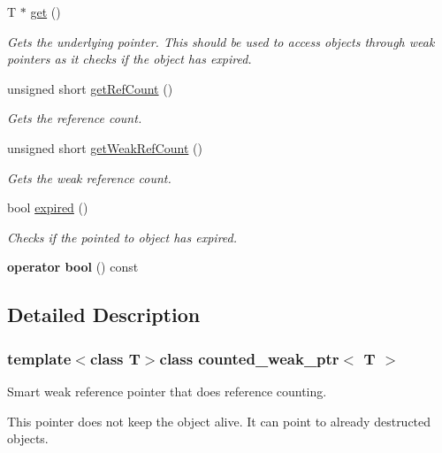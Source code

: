 \begin{DoxyCompactItemize}
\item 
T $\ast$ \hyperlink{classcounted__weak__ptr_af91469bcf5e4b264b864b2f70bd8fe8f}{get} ()
\begin{DoxyCompactList}\small\item\em Gets the underlying pointer. This should be used to access objects through weak pointers as it checks if the object has expired. \end{DoxyCompactList}\item 
unsigned short \hyperlink{classcounted__weak__ptr_a517d7112c959c60e3edf71cad59a2cc1}{get\+Ref\+Count} ()
\begin{DoxyCompactList}\small\item\em Gets the reference count. \end{DoxyCompactList}\item 
unsigned short \hyperlink{classcounted__weak__ptr_a7c49021dae1f203b888a6f1173e39852}{get\+Weak\+Ref\+Count} ()
\begin{DoxyCompactList}\small\item\em Gets the weak reference count. \end{DoxyCompactList}\item 
bool \hyperlink{classcounted__weak__ptr_ab1e9030c4af7b70382e4b03bbe4eab06}{expired} ()
\begin{DoxyCompactList}\small\item\em Checks if the pointed to object has expired. \end{DoxyCompactList}\item 
\hypertarget{classcounted__weak__ptr_a3f5fff6eb3afeef9dd0933558604ff8c}{}{\bfseries operator bool} () const \label{classcounted__weak__ptr_a3f5fff6eb3afeef9dd0933558604ff8c}

\end{DoxyCompactItemize}


\subsection{Detailed Description}
\subsubsection*{template$<$class T$>$class counted\+\_\+weak\+\_\+ptr$<$ T $>$}

Smart weak reference pointer that does reference counting. 

This pointer does not keep the object alive. It can point to already destructed objects.


